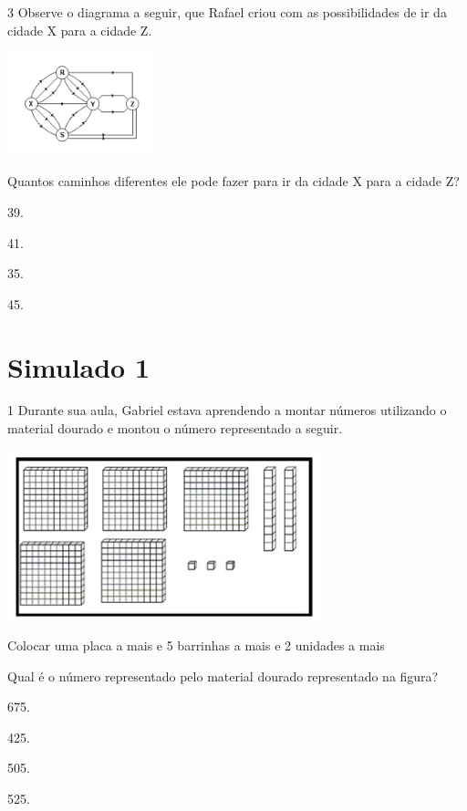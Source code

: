 \begin{mdframed}[linewidth=2pt,linecolor=salmao,roundcorner=2pt]
\begin{escolha}
{\begin{escolha}
\num{3} Observe o diagrama a seguir, que Rafael criou com as possibilidades de ir
da cidade X para a cidade Z.


\includegraphics[width=1.68348in,height=1.18344in]{media/image141.png}

Quantos caminhos diferentes ele pode fazer para ir da cidade X para a
cidade Z?

\begin{escolha}
\item
  39.
\item
  41.
\item
  35.
\item
  45.
\end{escolha}


\chapter{Simulado 1}

\num{1} Durante sua aula, Gabriel estava aprendendo a montar números utilizando o
material dourado e montou o número representado a seguir.

\includegraphics[width=3.55128in,height=1.93600in]{media/image142.png}

Colocar uma placa a mais e 5 barrinhas a mais e 2 unidades a mais

Qual é o número representado pelo material dourado representado na figura?

\begin{escolha}
\item
  675.
\item
  425.
\item
  505.
\item
  525.
\end{escolha}



\end{escolha}}
\end{escolha}
\end{mdframed}
